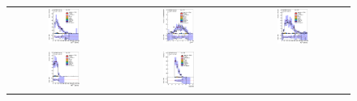\begin{figure}[h!]
\begin{center}
\begin{tabular}{ccc}
%
\includegraphics[width=0.30\textwidth]{appendices/figures/sdrs/LepPt_ELEMUONCR4_1W_NOMINAL.eps} &
\includegraphics[width=0.30\textwidth]{appendices/figures/sdrs/LepEta_ELEMUONCR4_1W_NOMINAL.eps} &
\includegraphics[width=0.30\textwidth]{appendices/figures/sdrs/MET_ELEMUONCR4_1W_NOMINAL.eps} \\
\includegraphics[width=0.30\textwidth]{appendices/figures/sdrs/Wlep_MassT_ELEMUONCR4_1W_NOMINAL.eps} &
\includegraphics[width=0.30\textwidth]{appendices/figures/sdrs/Njets25_ELEMUONCR4_1W_NOMINAL.eps}  &

\end{tabular}
\end{center}
\end{figure}
